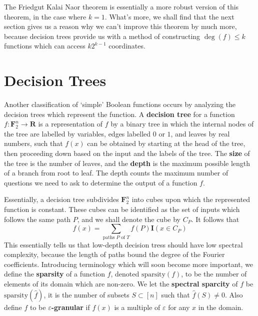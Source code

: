 The Friedgut Kalai Naor theorem is essentially a more robust version of this theorem, in the case where $k = 1$. What's more, we shall find that the next section gives us a reason why we can't improve this theorem by much more, because decision trees provide us with a method of constructing $\deg(f) \leq k$ functions which can access $k2^{k-1}$ coordinates.




\section{Decision Trees}

Another classification of `simple' Boolean functions occurs by analyzing the decision trees which represent the function. A {\bf decision tree} for a function $f: \mathbf{F}_2^n \to \mathbf{R}$ is a representation of $f$ by a binary tree in which the internal nodes of the tree are labelled by variables, edges labelled $0$ or $1$, and leaves by real numbers, such that $f(x)$ can be obtained by starting at the head of the tree, then proceeding down based on the input and the labels of the tree. The {\bf size} of the tree is the number of leaves, and the {\bf depth} is the maximum possible length of a branch from root to leaf. The depth counts the maximum number of questions we need to ask to determine the output of a function $f$.

Essentially, a decision tree subdivides $\mathbf{F}_2^n$ into cubes upon which the represented function is constant. These cubes can be identified as the set of inputs which follows the same path $P$, and we shall denote the cube by $C_P$. It follows that
%
\[ f(x) = \sum_{\text{paths $P$ of $T$}} f(P) \mathbf{I}(x \in C_P) \]
%
This essentially tells us that low-depth decision tress should have low spectral complexity, because the length of paths bound the degree of the Fourier coefficients. Introducing terminology which will soon become more important, we define the {\bf sparsity} of a function $f$, denoted $\text{sparsity}(f)$, to be the number of elements of its domain which are non-zero. We let the {\bf spectral sparcity} of $f$ be $\text{sparsity}(\widehat{f})$, it is the number of subsets $S \subset [n]$ such that $\widehat{f}(S) \neq 0$. Also define $f$ to be {\bf $\varepsilon$-granular} if $f(x)$ is a multiple of $\varepsilon$ for any $x$ in the domain.

